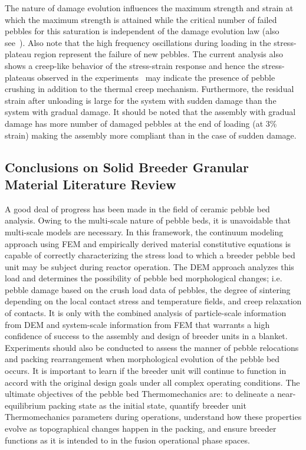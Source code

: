 The nature of damage evolution influences the maximum strength and strain at which the maximum strength is attained while the critical number of failed pebbles for this saturation is independent of the damage evolution law (also see~\cite{Zhao2010}). Also note that the high frequency oscillations during loading in the stress-plateau region represent the failure of new pebbles. The current analysis also shows a creep-like behavior of the stress-strain response and hence the stress-plateaus observed in the experiments~\cite{Reimann:2000tw} may indicate the presence of pebble crushing in addition to the thermal creep mechanism. Furthermore, the residual strain after unloading is large for the system with sudden damage than the system with gradual damage. It should be noted that the assembly with gradual damage has more number of damaged pebbles at the end of loading (at 3\% strain) making the assembly more compliant than in the case of sudden damage. 








\subsection{Conclusions on Solid Breeder Granular Material Literature Review}
A good deal of progress has been made in the field of ceramic pebble bed analysis. Owing to the multi-scale nature of pebble beds, it is unavoidable that multi-scale models are necessary. In this framework, the continuum modeling approach using FEM and empirically derived material constitutive equations is capable of correctly characterizing the stress load to which a breeder pebble bed unit may be subject during reactor operation. The DEM approach analyzes this load and determines the possibility of pebble bed morphological changes; i.e. pebble damage based on the crush load data of pebbles, the degree of sintering depending on the local contact stress and temperature fields, and creep relaxation of contacts. It is only with the combined analysis of particle-scale information from DEM and system-scale information from FEM that warrants a high confidence of success to the assembly and design of breeder units in a blanket.  Experiments should also be conducted to assess the manner of pebble relocations and packing rearrangement when morphological evolution of the pebble bed occurs. It is important to learn if the breeder unit will continue to function in accord with the original design goals under all complex operating conditions.  The ultimate objectives of the pebble bed Thermomechanics are: to delineate a near-equilibrium packing state as the initial state, quantify breeder unit Thermomechanics parameters during operations, understand how these properties evolve as topographical changes happen in the packing, and ensure breeder functions as it is intended to in the fusion operational phase spaces.



